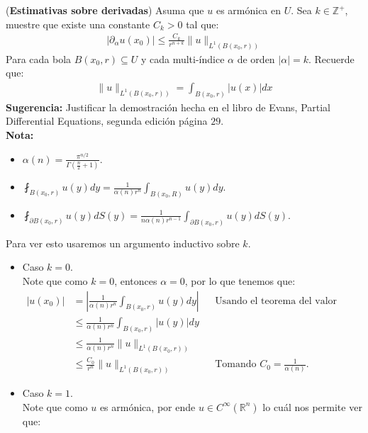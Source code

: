 \begin{homeworkProblem}
  (\textbf{Estimativas sobre derivadas}) Asuma que $u$ es armónica en $U$. Sea $k\in\mathbb{Z}^{+}$, muestre que existe una constante $C_k>0$ tal que:
  \begin{align*}
    |\partial_{\alpha}u(x_0)|\leq \frac{C_k}{r^{n+k}}\|u\|_{L^1(B(x_0,r))}
  \end{align*}
  Para cada bola $B(x_0,r)\subseteq U$ y cada multi-índice $\alpha$ de orden $|\alpha|=k$. Recuerde que:
  \begin{align*}
    \|u\|_{L^1(B(x_0,r))}=\int_{B(x_0,r)}|u(x)|dx
  \end{align*}
  \textbf{Sugerencia:} Justificar la demostración hecha en el libro de Evans, Partial Differential Equations, segunda edición página $29$.\\
  \textbf{Nota:}
  \begin{itemize}
    \item $\alpha(n)=\frac{\pi^{n/2}}{\Gamma(\frac{n}{2}+1)}$.
    \item $\fint_{B(x_0,r)}u(y)dy=\frac{1}{\alpha(n)r^n}\int_{B(x_0,R)}u(y)dy$.
    \item $\fint_{\partial B(x_0,r)}u(y)dS(y)=\frac{1}{n\alpha(n)r^{n-1}}\int_{\partial B(x_0,r)}u(y)dS(y)$.
  \end{itemize}
  \begin{solucion}
    Para ver esto usaremos un argumento inductivo sobre $k$.
    \begin{itemize}
      \item Caso $k=0$.\\
        Note que como $k=0$, entonces $\alpha=0$, por lo que tenemos que:
        \begin{align*}
          |u(x_0)|&=\left|\frac{1}{\alpha(n)r^n}\int_{B(x_0,r)}u(y)dy\right| && \text{Usando el teorema del valor medio de la E.Laplace.}\\
          &\leq \frac{1}{\alpha(n)r^n}\int_{B(x_0,r)}|u(y)|dy\\
          &\leq \frac{1}{\alpha(n)r^n}\|u\|_{L^1(B(x_0,r))}\\
          &\leq \frac{C_0}{r^{n}}\|u\|_{L^1(B(x_0,r))} &&\text{Tomando $C_0=\frac{1}{\alpha(n)}$.}
        \end{align*}
      \item Caso $k=1$.\\
        Note que como $u$ es armónica, por ende $u\in C^{\infty}(\mathbb{R}^{n})$ lo cuál nos permite ver que:
        \begin{align*}

\end{align*}
\end{itemize}
\end{solucion}
\end{homeworkProblem}
